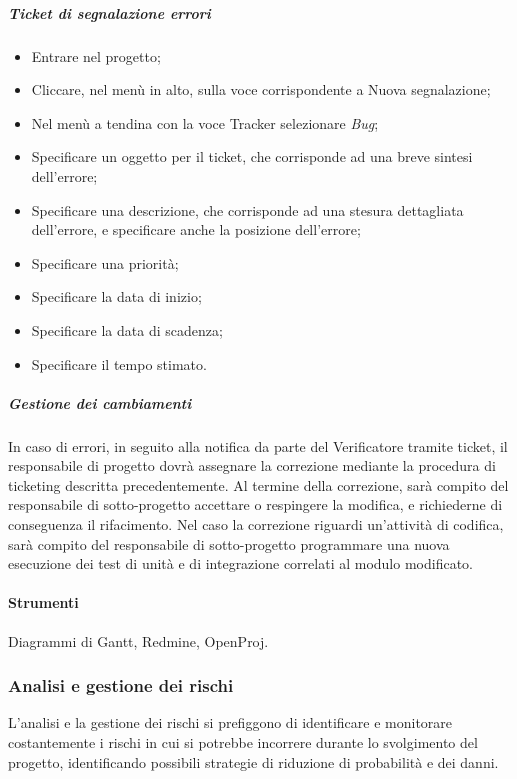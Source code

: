 \subparagraph{Ticket di segnalazione errori}
\label{ticket_bug}
\begin{itemize}
\item Entrare nel progetto;
\item Cliccare, nel menù in alto, sulla voce corrispondente a Nuova segnalazione;
\item Nel menù a tendina con la voce Tracker selezionare \textit{Bug};
\item Specificare un oggetto per il ticket, che corrisponde ad una breve sintesi dell'errore;
\item Specificare una descrizione, che corrisponde ad una stesura dettagliata dell'errore, e specificare anche la posizione dell'errore;
\item Specificare una priorità;
\item Specificare la data di inizio;
\item Specificare la data di scadenza;
\item Specificare il tempo stimato.
\end{itemize}

\subparagraph{Gestione dei cambiamenti}

In caso di errori, in seguito alla notifica da parte del Verificatore tramite ticket, il responsabile di progetto dovrà assegnare la correzione mediante la procedura di
ticketing descritta precedentemente.
Al termine della correzione, sarà compito del responsabile di sotto-progetto accettare o respingere la modifica, e richiederne di conseguenza il rifacimento.
Nel caso la correzione riguardi un’attività di codifica, sarà compito del responsabile di sotto-progetto programmare una nuova esecuzione dei test di unità e di integrazione correlati al modulo modificato.



\paragraph{Strumenti}
Diagrammi di Gantt, Redmine, OpenProj.


\subsubsection{Analisi e gestione dei rischi}

L'analisi e la gestione dei rischi si prefiggono di identificare e  monitorare costantemente i rischi in cui si potrebbe incorrere durante lo svolgimento del progetto, identificando possibili strategie di riduzione di probabilità e dei danni. 


